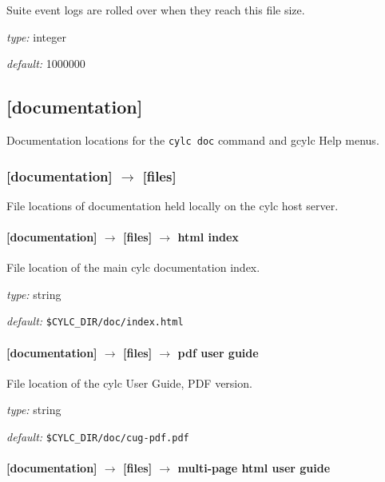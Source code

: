 Suite event logs are rolled over when they reach this file size. 

\begin{myitemize}
\item {\em type:} integer
\item {\em default:} 1000000 
\end{myitemize}

\subsection{[documentation]}

Documentation locations for the \lstinline=cylc doc= command and gcylc
Help menus. 

\subsubsection[{[[}files{]]}]{[documentation] $\rightarrow$ [files]}

File locations of documentation held locally on the cylc host server.

\paragraph[html index]{[documentation] $\rightarrow$ [files] $\rightarrow$ html index }

File location of the main cylc documentation index.
\begin{myitemize}
\item {\em type:} string
\item {\em default:} \lstinline=$CYLC_DIR/doc/index.html=
\end{myitemize}

\paragraph[pdf user guide]{[documentation] $\rightarrow$ [files] $\rightarrow$ pdf user guide }

File location of the cylc User Guide, PDF version.
\begin{myitemize}
\item {\em type:} string
\item {\em default:} \lstinline=$CYLC_DIR/doc/cug-pdf.pdf=
\end{myitemize}

\paragraph[multi-page html user guide]{[documentation] $\rightarrow$ [files] $\rightarrow$ multi-page html user guide }

